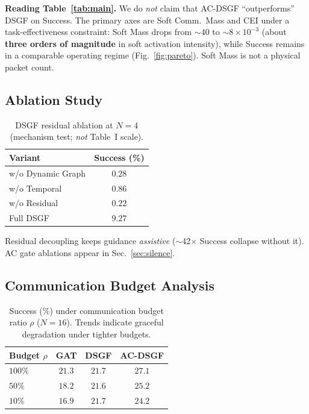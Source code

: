 \noindent
\textbf{Reading Table~\ref{tab:main}.}
We do \emph{not} claim that AC-DSGF ``outperforms'' DSGF on Success.
The primary axes are Soft Comm.\ Mass and CEI under a task-effectiveness
constraint: Soft Mass drops from ${\sim}40$ to ${\sim}8\times10^{-3}$
(about \textbf{three orders of magnitude} in soft activation intensity),
while Success remains in a comparable operating regime
(Fig.~\ref{fig:pareto}).
Soft Mass is not a physical packet count.

\subsection{Ablation Study}
\label{sec:ablation}

\begin{table}[t]
\centering
\caption{DSGF residual ablation at $N{=}4$ (mechanism test; \emph{not} Table~I scale).}
\label{tab:ablation}
\begin{tabular}{lc}
\toprule
Variant & Success (\%) \\
\midrule
w/o Dynamic Graph & $0.28$ \\
w/o Temporal      & $0.86$ \\
w/o Residual      & $0.22$ \\
Full DSGF         & $\mathbf{9.27}$ \\
\bottomrule
\end{tabular}
\end{table}

Residual decoupling keeps guidance \emph{assistive}
($\sim$42$\times$ Success collapse without it).
AC gate ablations appear in Sec.~\ref{sec:silence}.

\subsection{Communication Budget Analysis}
\label{sec:budget-res}

\begin{table}[t]
\centering
\caption{Success (\%) under communication budget ratio $\rho$ ($N{=}16$).
Trends indicate graceful degradation under tighter budgets.}
\label{tab:budget}
\begin{tabular}{lccc}
\toprule
Budget $\rho$ & GAT & DSGF & AC-DSGF \\
\midrule
$100\%$ & $21.3$ & $21.7$ & $27.1$ \\
$50\%$  & $18.2$ & $21.6$ & $25.2$ \\
$10\%$  & $16.9$ & $21.7$ & $24.2$ \\
\bottomrule
\end{tabular}
\end{table}

